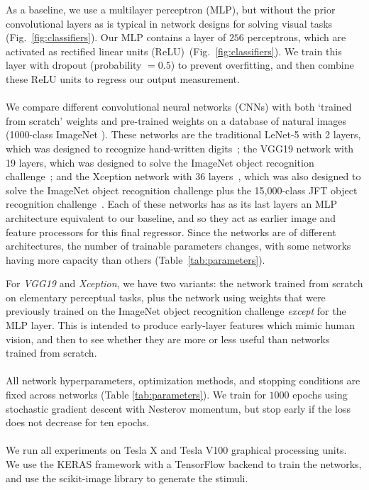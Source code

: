  As a baseline, we use a multilayer perceptron (MLP), but without the prior convolutional layers as is typical in network designs for solving visual tasks (Fig.~\ref{fig:classifiers}). Our MLP contains a layer of $256$ perceptrons, which are activated as rectified linear units (ReLU)~(Fig.~\ref{fig:classifiers}). We train this layer with dropout (probability $= 0.5$) to prevent overfitting, and then combine these ReLU units to regress our output measurement.
\\~\\
 We compare different convolutional neural networks (CNNs) with both `trained from scratch' weights and pre-trained weights on a database of natural images (1000-class ImageNet \cite{imagenet}). These networks are the traditional LeNet-5 with 2 layers, which was designed to recognize hand-written digits~\cite{lenet}; the VGG19 network with 19 layers, which was designed to solve the ImageNet object recognition challenge~\cite{simonyan_very_deep2014}; and the Xception network with 36 layers~\cite{xception}, which was also designed to solve the ImageNet object recognition challenge plus the 15,000-class JFT object recognition challenge~\cite{Hinton2015}. Each of these networks has as its last layers an MLP architecture equivalent to our baseline, and so they act as earlier image and feature processors for this final regressor. Since the networks are of different architectures, the number of trainable parameters changes, with some networks having more capacity than others (Table~\ref{tab:parameters}).

For \emph{VGG19} and \emph{Xception}, we have two variants: the network trained from scratch on elementary perceptual tasks, plus the network using weights that were previously trained on the ImageNet object recognition challenge \emph{except} for the MLP layer. This is intended to produce early-layer features which mimic human vision, and then to see whether they are more or less useful than networks trained from scratch. 
\\~\\
 All network hyperparameters, optimization methods, and stopping conditions are fixed across networks (Table \ref{tab:parameters}). We train for $1000$ epochs using stochastic gradient descent with Nesterov momentum, but stop early if the loss does not decrease for ten epochs.
\\~\\
 We run all experiments on Tesla X and Tesla V100 graphical processing units. We use the KERAS framework with a TensorFlow backend to train the networks, and use the scikit-image library to generate the stimuli. %

